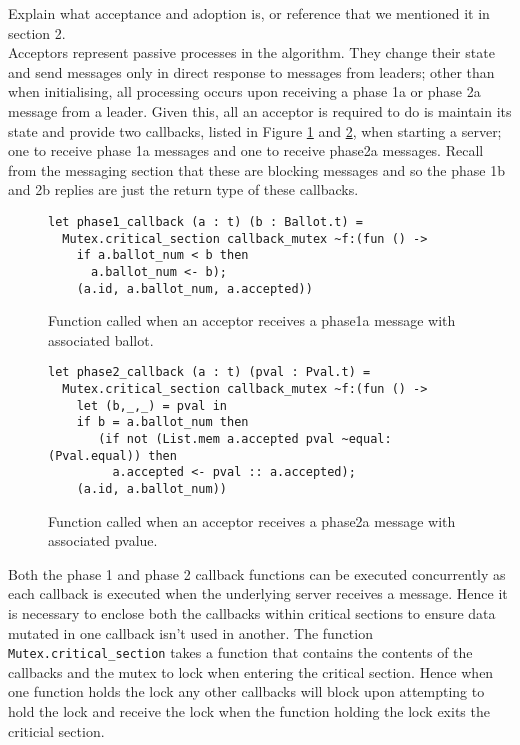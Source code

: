 {\color{red}Explain what acceptance and adoption is, or reference that we mentioned it in section 2.} \\

Acceptors represent passive processes in the algorithm. They change their state and send messages only in direct response to messages from leaders; other than when initialising, all processing occurs upon receiving a phase 1a or phase 2a message from a leader. Given this, all an acceptor is required to do is maintain its state and provide two callbacks, listed in Figure \ref{fig:acceptor-phase1} and \ref{fig:acceptor-phase2}, when starting a server; one to receive phase 1a messages and one to receive phase2a messages. Recall from {\color{red}the messaging section} that these are blocking messages and so the phase 1b and 2b replies are just the return type of these callbacks. \\

\begin{figure}
  \begin{lstlisting}
let phase1_callback (a : t) (b : Ballot.t) =
  Mutex.critical_section callback_mutex ~f:(fun () ->
    if a.ballot_num < b then
      a.ballot_num <- b);
    (a.id, a.ballot_num, a.accepted))
\end{lstlisting}
  \centering
  \caption{Function called when an acceptor receives a phase1a message with associated ballot.}
  \label{fig:acceptor-phase1}
\end{figure}

\begin{figure}
  \begin{lstlisting}
let phase2_callback (a : t) (pval : Pval.t) =
  Mutex.critical_section callback_mutex ~f:(fun () ->
    let (b,_,_) = pval in
    if b = a.ballot_num then
       (if not (List.mem a.accepted pval ~equal:(Pval.equal)) then
         a.accepted <- pval :: a.accepted);
    (a.id, a.ballot_num))
  \end{lstlisting}
  \centering
  \caption{Function called when an acceptor receives a phase2a message with associated pvalue.}
  \label{fig:acceptor-phase2}
\end{figure}

Both the phase 1 and phase 2 callback functions can be executed concurrently as each callback is executed when the underlying server receives a message. Hence it is necessary to enclose both the callbacks within critical sections to ensure data mutated in one callback isn't used in another. The function \texttt{Mutex.critical\_section} takes a function that contains the contents of the callbacks and the mutex to lock when entering the critical section. Hence when one function holds the lock any other callbacks will block upon attempting to hold the lock and receive the lock when the function holding the lock exits the criticial section. \\

